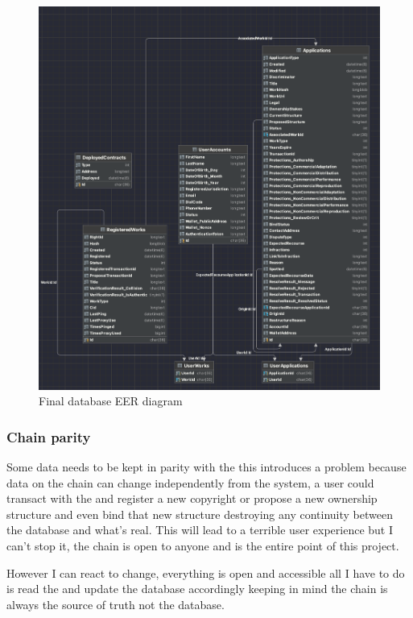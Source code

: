 \begin{figure}[H]
\caption{Final database EER diagram}
\centering
\includegraphics[width=\textwidth,height=0.7\textheight,keepaspectratio]{images/patterns/database}
\end{figure}

\subsubsection{Chain parity}
\label{sec:chain-parity}

Some data needs to be kept in parity with the  this introduces a problem because data on the chain can change independently from the system, a user could transact with the  and register a new copyright or propose a new ownership structure and even bind that new structure destroying any continuity between the database and what's real. This will lead to a terrible user experience but I can't stop it, the chain is open to anyone and is the entire point of this project.

However I can react to change, everything is open and accessible all I have to do is read the  and update the database accordingly keeping in mind the chain is always the source of truth not the database.

